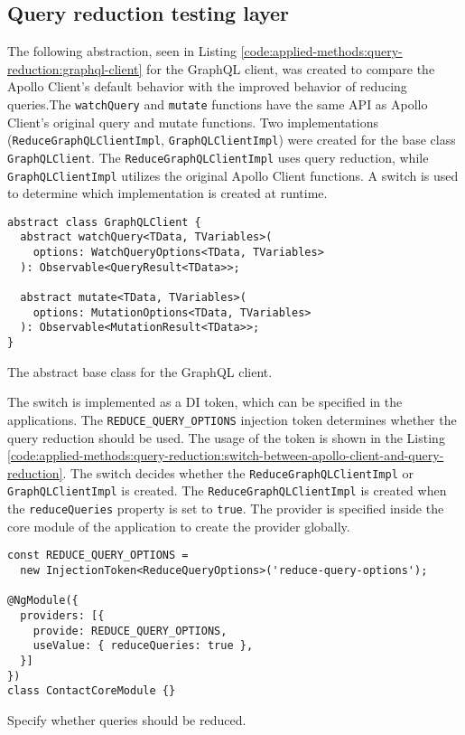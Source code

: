 \subsection{Query reduction testing layer}\label{subsection:applied-methods:query-reduction:testing-query-reduction}

The following abstraction, seen in Listing \ref{code:applied-methods:query-reduction:graphql-client} for the GraphQL client, was created to compare the Apollo Client's default behavior with the improved behavior of reducing queries.The \texttt{watchQuery} and \texttt{mutate} functions have the same \ac{API} as Apollo Client's original query and mutate functions. Two implementations (\texttt{ReduceGraphQLClientImpl}, \texttt{GraphQLClientImpl}) were created for the base class \texttt{GraphQLClient}. The \texttt{ReduceGraphQLClientImpl} uses query reduction, while \texttt{GraphQLClientImpl} utilizes the original Apollo Client functions. A switch is used to determine which implementation is created at runtime.

\ifshowListings
\begin{listing}[H]
\begin{verbatim}
abstract class GraphQLClient {
  abstract watchQuery<TData, TVariables>(
    options: WatchQueryOptions<TData, TVariables>
  ): Observable<QueryResult<TData>>;

  abstract mutate<TData, TVariables>(
    options: MutationOptions<TData, TVariables>
  ): Observable<MutationResult<TData>>;
}
\end{verbatim}
\caption{The abstract base class for the GraphQL client.}\label{code:applied-methods:query-reduction:graphql-client}
\end{listing}
\fi

\noindent The switch is implemented as a \ac{DI} token, which can be specified in the applications. The \texttt{REDUCE\_QUERY\_OPTIONS} injection token determines whether the query reduction should be used. The usage of the token is shown in the Listing \ref{code:applied-methods:query-reduction:switch-between-apollo-client-and-query-reduction}. The switch decides whether the \texttt{ReduceGraphQLClientImpl} or \texttt{GraphQLClientImpl} is created. The \texttt{ReduceGraphQLClientImpl} is created when the \texttt{reduceQueries} property is set to \texttt{true}. The provider is specified inside the core module of the application to create the provider globally.

\ifshowListings
\begin{listing}[H]
\begin{verbatim}
const REDUCE_QUERY_OPTIONS = 
  new InjectionToken<ReduceQueryOptions>('reduce-query-options');

@NgModule({
  providers: [{
    provide: REDUCE_QUERY_OPTIONS,
    useValue: { reduceQueries: true },
  }]
})
class ContactCoreModule {}
\end{verbatim}
\caption{Specify whether queries should be reduced.}\label{code:applied-methods:query-reduction:switch-between-apollo-client-and-query-reduction}
\end{listing}
\fi

